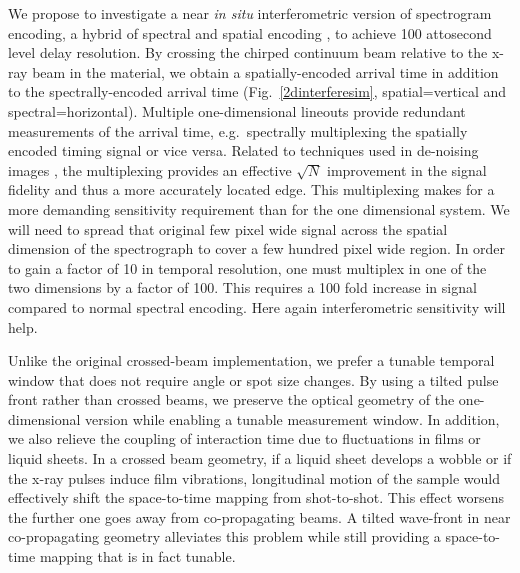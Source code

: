 \documentclass[letterpaper,oneside,11pt]{article}
\begin{document}
We propose to investigate a near \textit{in situ} interferometric version of spectrogram encoding, a hybrid of spectral and spatial encoding \cite{Nick2014}, to achieve 100 attosecond level delay resolution.
By crossing the chirped continuum beam relative to the x-ray beam in the material, we obtain a spatially-encoded arrival time in addition to the spectrally-encoded arrival time (Fig.~\ref{2dinterferesim}, spatial=vertical and spectral=horizontal). 
Multiple one-dimensional lineouts provide redundant measurements of the arrival time, e.g.~spectrally multiplexing the spatially encoded timing signal or vice versa.
Related to techniques used in de-noising images \cite{Candes2004a,Candes2004b,Candes2005,Elad2006}, the multiplexing provides an effective $\sqrt{N}$ improvement in the signal fidelity and thus a more accurately located edge.
This multiplexing makes for a more demanding sensitivity requirement than for the one dimensional system.
We will need to spread that original few pixel wide signal across the spatial dimension of the spectrograph to cover a few hundred pixel wide region.
In order to gain a factor of 10 in temporal resolution, one must multiplex in one of the two dimensions by a factor of 100.
This requires a 100 fold increase in signal compared to normal spectral encoding.
Here again interferometric sensitivity will help.

Unlike the original crossed-beam implementation, we prefer a tunable temporal window that does not require angle or spot size changes.
By using a tilted pulse front rather than crossed beams, we preserve the optical geometry of the one-dimensional version while enabling a tunable measurement window.
In addition, we also relieve the coupling of interaction time due to fluctuations in films or liquid sheets. 
In a crossed beam geometry, if a liquid sheet develops a wobble or if the x-ray pulses induce film vibrations, longitudinal motion of the sample would effectively shift the space-to-time mapping from shot-to-shot.
This effect worsens the further one goes away from co-propagating beams.
A tilted wave-front in near co-propagating geometry alleviates this problem while still providing a space-to-time mapping that is in fact tunable.
\end{document}
